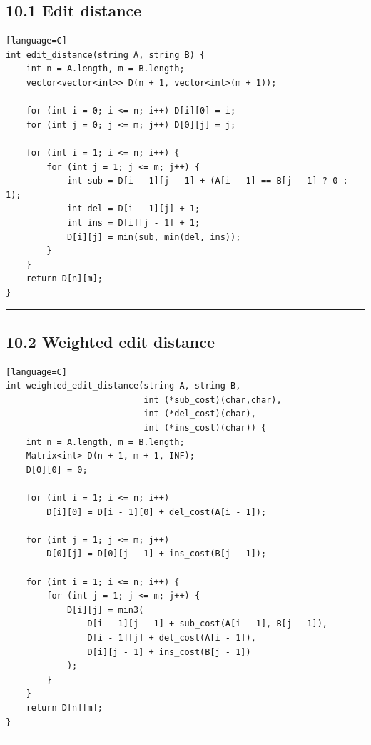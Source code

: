\documentclass[11pt]{article}
\begin{document}
\subsection{10.1 Edit distance}\label{edit-distance}

\begin{verbatim}[language=C]
int edit_distance(string A, string B) {
    int n = A.length, m = B.length;
    vector<vector<int>> D(n + 1, vector<int>(m + 1));

    for (int i = 0; i <= n; i++) D[i][0] = i;
    for (int j = 0; j <= m; j++) D[0][j] = j;

    for (int i = 1; i <= n; i++) {
        for (int j = 1; j <= m; j++) {
            int sub = D[i - 1][j - 1] + (A[i - 1] == B[j - 1] ? 0 : 1);
            int del = D[i - 1][j] + 1;
            int ins = D[i][j - 1] + 1;
            D[i][j] = min(sub, min(del, ins));
        }
    }
    return D[n][m];
}
\end{verbatim}

\begin{center}\rule{0.5\linewidth}{0.5pt}\end{center}

\subsection{10.2 Weighted edit distance}\label{weighted-edit-distance}

\begin{verbatim}[language=C]
int weighted_edit_distance(string A, string B,
                           int (*sub_cost)(char,char),
                           int (*del_cost)(char),
                           int (*ins_cost)(char)) {
    int n = A.length, m = B.length;
    Matrix<int> D(n + 1, m + 1, INF);
    D[0][0] = 0;

    for (int i = 1; i <= n; i++)
        D[i][0] = D[i - 1][0] + del_cost(A[i - 1]);

    for (int j = 1; j <= m; j++)
        D[0][j] = D[0][j - 1] + ins_cost(B[j - 1]);

    for (int i = 1; i <= n; i++) {
        for (int j = 1; j <= m; j++) {
            D[i][j] = min3(
                D[i - 1][j - 1] + sub_cost(A[i - 1], B[j - 1]),
                D[i - 1][j] + del_cost(A[i - 1]),
                D[i][j - 1] + ins_cost(B[j - 1])
            );
        }
    }
    return D[n][m];
}
\end{verbatim}

\begin{center}\rule{0.5\linewidth}{0.5pt}\end{center}
\end{document}
